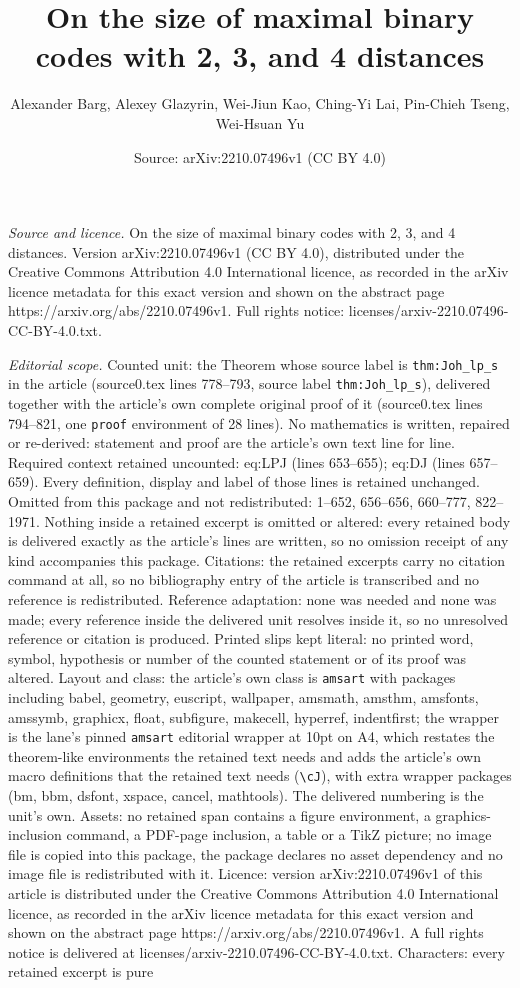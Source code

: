 \documentclass[10pt,a4paper]{amsart}
\title[On the size of maximal binary codes with 2, 3, and 4 distanc]{On the size of maximal binary codes with 2, 3, and 4 distances}
\author{Alexander Barg, Alexey Glazyrin, Wei-Jiun Kao, Ching-Yi Lai, Pin-Chieh Tseng, Wei-Hsuan Yu}
\date{Source: arXiv:2210.07496v1 (CC BY 4.0)}
\begin{document}
\maketitle

\noindent\emph{Source and licence.} On the size of maximal binary codes with 2, 3, and 4 distances. Version arXiv:2210.07496v1 (CC BY 4.0), distributed under the Creative Commons Attribution 4.0 International licence, as recorded in the arXiv licence metadata for this exact version and shown on the abstract page https://arxiv.org/abs/2210.07496v1. Full rights notice: licenses/arxiv-2210.07496-CC-BY-4.0.txt.\par\smallskip

\noindent\textit{Editorial scope.} Counted unit: the Theorem whose source label is \texttt{thm:Joh\_lp\_s} in the article (source0.tex lines 778--793, source label \texttt{thm:Joh\_lp\_s}), delivered together with the article's own complete original proof of it (source0.tex lines 794--821, one \texttt{proof} environment of 28 lines). No mathematics is written, repaired or re-derived: statement and proof are the article's own text line for line. Required context retained uncounted: eq:LPJ (lines 653--655); eq:DJ (lines 657--659). Every definition, display and label of those lines is retained unchanged. Omitted from this package and not redistributed: 1--652, 656--656, 660--777, 822--1971. Nothing inside a retained excerpt is omitted or altered: every retained body is delivered exactly as the article's lines are written, so no omission receipt of any kind accompanies this package. Citations: the retained excerpts carry no citation command at all, so no bibliography entry of the article is transcribed and no reference is redistributed. Reference adaptation: none was needed and none was made; every reference inside the delivered unit resolves inside it, so no unresolved reference or citation is produced. Printed slips kept literal: no printed word, symbol, hypothesis or number of the counted statement or of its proof was altered. Layout and class: the article's own class is \texttt{amsart} with packages including babel, geometry, euscript, wallpaper, amsmath, amsthm, amsfonts, amssymb, graphicx, float, subfigure, makecell, hyperref, indentfirst; the wrapper is the lane's pinned \texttt{amsart} editorial wrapper at 10pt on A4, which restates the theorem-like environments the retained text needs and adds the article's own macro definitions that the retained text needs (\texttt{\textbackslash cJ}), with extra wrapper packages (bm, bbm, dsfont, xspace, cancel, mathtools). The delivered numbering is the unit's own. Assets: no retained span contains a figure environment, a graphics-inclusion command, a PDF-page inclusion, a table or a TikZ picture; no image file is copied into this package, the package declares no asset dependency and no image file is redistributed with it. Licence: version arXiv:2210.07496v1 of this article is distributed under the Creative Commons Attribution 4.0 International licence, as recorded in the arXiv licence metadata for this exact version and shown on the abstract page https://arxiv.org/abs/2210.07496v1. A full rights notice is delivered at licenses/arxiv-2210.07496-CC-BY-4.0.txt. Characters: every retained excerpt is pure 
\end{document}
